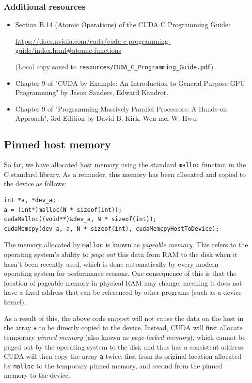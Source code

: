 \documentclass{article}
\newcommand{\resource}[1]{(Local copy saved to \texttt{#1})}
\theoremstyle{definition}
\begin{document}
\subsubsection*{Additional resources}
\begin{itemize}
    \item Section B.14 (Atomic Operations) of the CUDA C Programming Guide:
    
    \url{https://docs.nvidia.com/cuda/cuda-c-programming-guide/index.html#atomic-functions}
    
    \resource{resources/CUDA\_C\_Programming\_Guide.pdf}
    
    \item Chapter 9 of "CUDA by Example: An Introduction to General-Purpose GPU Programming" by Jason Sanders, Edward Kandrot.
    
    \item Chapter 9 of "Programming Massively Parallel Processors: A Hands-on Approach", 3rd Edition by David B. Kirk, Wen-mei W. Hwu.
\end{itemize}

\subsection{Pinned host memory}

So far, we have allocated host memory using the standard \texttt{malloc} function in the C standard library. As a reminder, this memory has been allocated and copied to the device as follows:
\begin{verbatim}
int *a, *dev_a;
a = (int*)malloc(N * sizeof(int));
cudaMalloc((void**)&dev_a, N * sizeof(int));
cudaMemcpy(dev_a, a, N * sizeof(int), cudaMemcpyHostToDevice);
\end{verbatim}

The memory allocated by \texttt{malloc} is known as \emph{pageable memory}. This refers to the operating system's ability to \emph{page out} this data from RAM to the disk when it hasn't been recently used, which is done automatically by every modern operating system for performance reasons. One consequence of this is that the location of pageable memory in physical RAM may change, meaning it does not have a fixed address that can be referenced by other programs (such as a device kernel). 

As a result of this, the above code snippet will not cause the data on the host in the array \texttt{a} to be directly copied to the device. Instead, CUDA will first allocate temporary \emph{pinned memory} (also known as \emph{page-locked memory}), which cannot be paged out by the operating system to the disk and thus has a consistent address. CUDA will then copy the array \texttt{a} twice: first from its original location allocated by \texttt{malloc} to the temporary pinned memory, and second from the pinned memory to the device.
\end{document}
